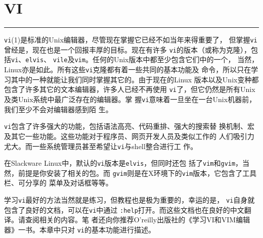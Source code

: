 \chapter{VI}
\label{chap:vi}

\begin{flushleft}
\rule{\textwidth}{0.1pt}
\end{flushleft}

\texttt{vi}(1)是标准的Unix编辑器，尽管现在掌握它已经不如当年来得重要了，
但掌握\texttt{vi}曾经是，现在也是一个回报丰厚的目标。现在有许多
\texttt{vi}的版本（或称为克隆），包括\texttt{vi}、\texttt{elvis}、
\texttt{vile}及\texttt{vim}。任何的Unix版本中都至少包含它们中的一个，
当然，Linux亦是如此。所有这些\texttt{vi}克隆都有着一些共同的基本功能及
命令，所以只在学习其中的一种就能让我们同时掌握其它的。由于现在的Linux
版本以及Unix变种都包含了许多其它的文本编辑器，许多人已经不再使用
\texttt{vi}了，但它仍然是所有Unix及类Unix系统中最广泛存在的编辑器。掌
握\texttt{vi}意味着一旦坐在一台Unix机器前，我们至少不会对编辑器感到陌
生。

\texttt{vi}包含了许多强大的功能，包括语法高亮、代码重排、强大的搜索替
换机制、宏及其它一些功能。这些功能对于程序员、网页开发人员及类似工作的
人们吸引力尤大。而一些系统管理员甚至希望让\texttt{vi}与shell整合进行工
作。

在Slackware Linux中，默认的\texttt{vi}版本是\texttt{elvis}，但同时还包
括了\texttt{vim}和\texttt{gvim}，当然，前提是你安装了相关的包。而
\texttt{gvim}则是在X环境下的\texttt{vim}版本，它包含了工具栏、可分享的
菜单及对话框等等。

学习\texttt{vi}最好的方法当然就是练习，但教程也是极为重要的，幸运的是，
\texttt{vi}自身就包含了良好的文档，可以在\texttt{vi}中通过
\texttt{:help}打开。而这些文档也在良好的中文翻译。请查阅相关的内容。笔
者还向你推荐O'reilly出版社的《学习VI和VIM编辑器》一书。本章中只对
\texttt{vi}的基本功能进行描述。

